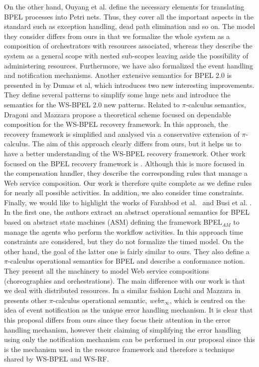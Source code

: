 On the other hand, Ouyang et al. \cite{Ouyang:2007} define the necessary elements for translating BPEL processes into Petri nets. Thus, they
cover all the important aspects in the standard such as exception handling, dead path elimination and so on. The model they consider differs from ours in that we formalize the whole
system as a composition of orchestrators with resources associated, whereas they describe the system as a general scope with nested sub-scopes leaving aside the possibility of administering resources. Furthermore, we have also formalized the event handling and notification mechanisms.
Another extensive semantics for BPEL 2.0
is presented in \cite{Dumas:2008} by Dumas et al, which introduces two new interesting improvements. They define several patterns to simplify some huge nets and introduce the semantics for the WS-BPEL 2.0 new patterns. Related to $\pi$-calculus semantics, Dragoni and Mazzara \cite{Dragoni:2009}
propose a theoretical scheme focused on dependable composition for the  WS-BPEL recovery
framework. In this approach, the recovery framework is simplified
and analysed via a conservative extension of $\pi$-calculus. The
aim of this approach clearly differs from ours, but it helps us to have
a better understanding of the WS-BPEL recovery framework. Other work focused on the BPEL
recovery framework is \cite{Qiu:2005}. Although this is more focused in the compensation handler, they describe the corresponding rules
that manage a Web service composition. Our work is therefore quite complete as we define rules for nearly all possible activities. In addition, we also consider time constraints. Finally, we would like to highlight the works of Farahbod et al.~\cite{Farahbod:2005} and Busi et al. \cite{Busi:2005}. In the first one, the authors extract an abstract operational semantics for BPEL based on abstract state machines (ASM) defining the framework BPEL$_{AM}$ to manage the agents who perform the workflow activities. In this approach time constraints are considered, but they do not formalize the timed model. On the other hand, the goal of the latter one is fairly similar to ours. They also define a $\pi$-calculus operational semantics for BPEL and describe a conformance notion. They present all the machinery to model Web service compositions (choreographies and orchestrations). The main difference with our work is that we deal with distributed resources. In a similar fashion Luchi and Mazzara in \cite{Lucchi07} presents other $\pi$-calculus operational semantic, \textit{web}$\pi_{\infty}$, which is centred on the idea of event notification as the unique error handling mechanism. It is clear that this proposal differs from ours since they focus their attention in the error handling mechanism, however their claiming of simplifying the error handling using only the notification mechanism can be performed in our proposal since this is the mechanism used in the resource framework and therefore a technique shared by WS-BPEL and WS-RF.
